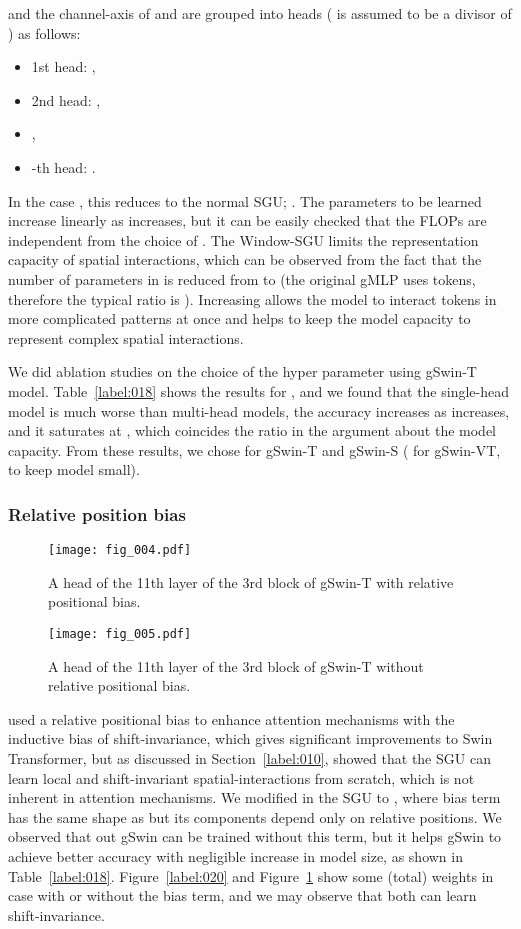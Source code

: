 \documentclass{article}
\begin{document}
and the channel-axis of  and  are grouped into  heads ( is assumed to be a divisor of ) as follows:
\begin{itemize}
    \item 1st head: ,
    \item 2nd head: ,
    \item ,
    \item -th head: .
\end{itemize}
In the case , this reduces to the normal SGU; .
The parameters to be learned increase linearly as  increases, but it can be easily checked that the FLOPs are independent from the choice of .
The Window-SGU limits the representation capacity of spatial interactions, which can be observed from the fact that the number of parameters in  is reduced from  to  (the original gMLP uses  tokens, therefore the typical ratio is ).
Increasing  allows the model to interact tokens in more complicated patterns at once and helps to keep the model capacity to represent complex spatial interactions.

We did ablation studies on the choice of the hyper parameter  using gSwin-T model.
Table~\ref{label:018} shows the results for , and we found that the single-head model is much worse than multi-head models, the accuracy increases as  increases, and it saturates at , which coincides the ratio  in the argument about the model capacity.
From these results, we chose  for gSwin-T and gSwin-S ( for gSwin-VT, to keep model small).

\subsubsection{Relative position bias}
\begin{figure}
    \centering
    \texttt{[image: fig\_004.pdf]}
    \caption{A head of the 11th layer of the 3rd block of gSwin-T with relative positional bias.}
    \label{label:020}
    \centering
    \texttt{[image: fig\_005.pdf]}
    \caption{A head of the 11th layer of the 3rd block of gSwin-T without relative positional bias.}
    \label{label:021}
\end{figure}

\cite{liu2021swin} used a relative positional bias to enhance attention mechanisms with the inductive bias of shift-invariance, which gives significant improvements to Swin Transformer, but as discussed in Section~\ref{label:010}, \cite{liu2021pay} showed that the SGU can learn local and shift-invariant spatial-interactions from scratch, which is not inherent in attention mechanisms.
We modified  in the SGU to , where bias term  has the same shape as  but its components depend only on relative positions.
We observed that out gSwin can be trained without this term, but it helps gSwin to achieve better accuracy with negligible increase in model size, as shown in Table~\ref{label:018}.
Figure~\ref{label:020} and Figure~\ref{label:021} show some (total) weights  in case with or without the bias term, and we may observe that both can learn shift-invariance.
\end{document}
